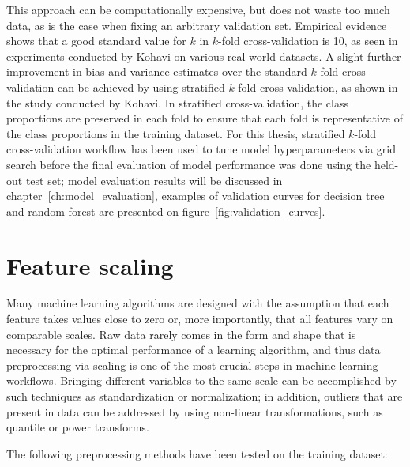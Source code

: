 This approach can be computationally expensive, but does not waste too much data, as is the case when fixing an arbitrary validation set.
Empirical evidence shows that a good standard value for $k$ in $k$-fold cross-validation is 10, as seen in experiments conducted by Kohavi on various real-world datasets\cite{Kohavi1995}.
A slight further improvement in bias and variance estimates over the standard $k$-fold cross-validation can be achieved by using stratified $k$-fold cross-validation, as shown in the study conducted by Kohavi.
In stratified cross-validation, the class proportions are preserved in each fold to ensure that each fold is representative of the class proportions in the training dataset.
For this thesis, stratified $k$-fold cross-validation workflow has been used to tune model hyperparameters via grid search before the final evaluation of model performance was done using the held-out test set;
model evaluation results will be discussed in chapter~\ref{ch:model_evaluation}, examples of validation curves for decision tree and random forest are presented on figure~\ref{fig:validation_curves}.

\section{Feature scaling} \label{sec:feature_scaling}

Many machine learning algorithms are designed with the assumption that each feature takes values close to zero or, more importantly, that all features vary on comparable scales\cite{Scikit-learndevelopers2019b}.
Raw data rarely comes in the form and shape that is necessary for the optimal performance of a learning algorithm, and thus data preprocessing via scaling is one of the most crucial steps in machine learning workflows\cite{RaschkaMirjalili2017}.
Bringing different variables to the same scale can be accomplished by such techniques as standardization or normalization;
in addition, outliers that are present in data can be addressed by using non-linear transformations, such as quantile or power transforms.

\vspace{5mm}

The following preprocessing methods have been tested on the training dataset:

